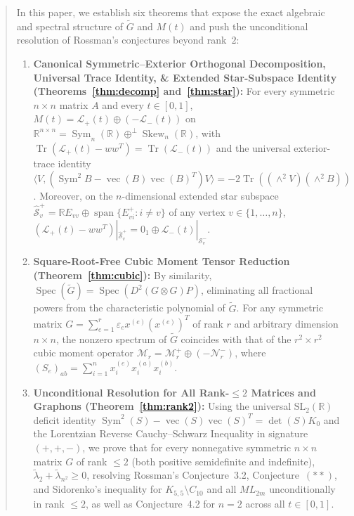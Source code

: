 \documentclass[11pt,a4paper]{article}
\theoremstyle{plain}
\theoremstyle{definition}
\theoremstyle{remark}
\DeclareMathOperator{\Tr}{Tr}
\DeclareMathOperator{\Spec}{Spec}
\DeclareMathOperator{\Sym}{Sym}
\DeclareMathOperator{\Skew}{Skew}
\DeclareMathOperator{\vecop}{vec}
\begin{document}
\begin{abstract}
In this paper, we establish six theorems that expose the exact algebraic and spectral structure of $\widetilde{G}$ and $M(t)$ and push the unconditional resolution of Rossman's conjectures beyond rank~$2$:
\begin{enumerate}[label=(\arabic*),nosep,leftmargin=2em]
  \item \textbf{Canonical Symmetric--Exterior Orthogonal Decomposition, Universal Trace Identity, \& Extended Star-Subspace Identity (Theorems~\ref{thm:decomp} and~\ref{thm:star}):} For every symmetric $n \times n$ matrix $A$ and every $t \in [0,1]$, $M(t) = \mathcal{L}_+(t) \oplus (-\mathcal{L}_-(t))$ on $\mathbb{R}^{n \times n} = \Sym_n(\mathbb{R}) \oplus^{\perp} \Skew_n(\mathbb{R})$, with $\Tr(\mathcal{L}_+(t) - w w^T) = \Tr(\mathcal{L}_-(t))$ and the universal exterior-trace identity $\langle V, (\Sym^2 B - \vecop(B)\vecop(B)^T)V \rangle = -2\Tr((\wedge^2 V)(\wedge^2 B))$. Moreover, on the $n$-dimensional extended star subspace $\widehat{\mathcal{S}}_v^+ = \mathbb{R}E_{vv} \oplus \operatorname{span}\{E_{vi}^+ : i \ne v\}$ of any vertex $v \in \{1,\dots,n\}$, $(\mathcal{L}_+(t) - w w^T)|_{\widehat{\mathcal{S}}_v^+} = 0_1 \oplus \mathcal{L}_-(t)|_{\mathcal{S}_v^-}$.
  \item \textbf{Square-Root-Free Cubic Moment Tensor Reduction (Theorem~\ref{thm:cubic}):} By similarity, $\Spec(\widetilde{G}) = \Spec(D^2(G \otimes G)P)$, eliminating all fractional powers from the characteristic polynomial of $\widetilde{G}$. For any symmetric matrix $G = \sum_{e=1}^r \varepsilon_e x^{(e)}(x^{(e)})^T$ of rank $r$ and arbitrary dimension $n \times n$, the nonzero spectrum of $\widetilde{G}$ coincides with that of the $r^2 \times r^2$ cubic moment operator $\mathcal{M}_r = \mathcal{M}_r^+ \oplus (-\mathcal{N}_r^-)$, where $(S_e)_{ab} = \sum_{i=1}^n x_i^{(e)} x_i^{(a)} x_i^{(b)}$.
  \item \textbf{Unconditional Resolution for All Rank-$\le 2$ Matrices and Graphons (Theorem~\ref{thm:rank2}):} Using the universal $\mathrm{SL}_2(\mathbb{R})$ deficit identity $\Sym^2(S) - \vecop(S)\vecop(S)^T = \det(S)K_0$ and the Lorentzian Reverse Cauchy--Schwarz Inequality in signature $(+,+,-)$, we prove that for every nonnegative symmetric $n \times n$ matrix $G$ of rank $\le 2$ (both positive semidefinite and indefinite), $\widetilde{\lambda}_2 + \widetilde{\lambda}_{n^2} \ge 0$, resolving Rossman's Conjecture~3.2, Conjecture~$(**)$, and Sidorenko's inequality for $K_{5,5} \setminus C_{10}$ and all $ML_{2m}$ unconditionally in rank $\le 2$, as well as Conjecture~4.2 for $n = 2$ across all $t \in [0,1]$.

\end{enumerate}
\end{abstract}
\end{document}

